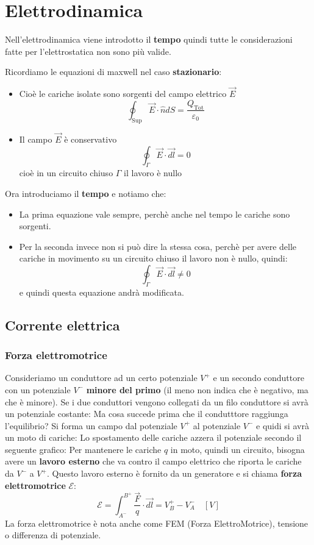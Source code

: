 \documentclass[a4paper]{article}
\begin{document}
\section{Elettrodinamica}
Nell'elettrodinamica viene introdotto il \textbf{tempo} quindi tutte le considerazioni
fatte per l'elettrostatica non sono più valide.

Ricordiamo le equazioni di maxwell nel caso \textbf{stazionario}:
\begin{itemize}
  \item 
    Cioè le cariche isolate sono sorgenti del campo elettrico \( \vec{E} \) 
    \[
      \oint_{\text{Sup}} \vec{E} \cdot \hat{n} dS = \frac{Q_{\text{Tot}}}{\varepsilon_0}
    \] 

  \item Il campo \( \vec{E} \) è conservativo
    \[
      \oint_{\Gamma} \vec{E} \cdot \vec{dl} = 0
    \] 
    cioè in un circuito chiuso \( \Gamma \) il lavoro è nullo
\end{itemize}
Ora introduciamo il \textbf{tempo} e notiamo che:
\begin{itemize}
  \item La prima equazione vale sempre, perchè anche nel tempo le cariche sono sorgenti.

  \item Per la seconda invece non si può dire la stessa cosa, perchè per avere delle 
    cariche in movimento su un circuito chiuso il lavoro non è nullo, quindi:
    \[
      \oint_{\Gamma } \vec{E} \cdot \vec{dl} \neq 0
    \] 
    e quindi questa equazione andrà modificata.
\end{itemize}

\subsection{Corrente elettrica}
\subsubsection{Forza elettromotrice}
Consideriamo un conduttore ad un certo potenziale \( V^+ \)  e un secondo conduttore con
un potenziale \( V^- \)  \textbf{minore del primo} (il meno non indica che è negativo,
ma che è minore).
\label{30-04-D1}
Se i due conduttori vengono collegati da un filo conduttore si avrà un potenziale costante:
\label{30-04-D2}
Ma cosa succede prima che il condutttore raggiunga l'equilibrio?
Si forma un campo dal potenziale \( V^+ \) al potenziale \( V^- \)  e quidi si avrà
un moto di cariche:
\label{30-04-D3}
Lo spostamento delle cariche azzera il potenziale secondo il seguente grafico:
\label{30-04-D4}
Per mantenere le cariche \( q \) in moto, quindi un circuito, bisogna avere un \textbf{lavoro
esterno} che va contro il campo elettrico che riporta le cariche da \( V^- \) a
\( V^+ \). Questo lavoro esterno è fornito da un generatore e si chiama \textbf{forza
elettromotrice} \( \mathcal{E} \):
\label{30-04-D5}
\[
  \mathcal{E} = \int_{A^-}^{B^+} \frac{\vec{F}}{q} \cdot \vec{dl}
  = V^+_B - V^-_A \quad \left[ V \right]
\] 
La forza elettromotrice è nota anche come FEM (Forza ElettroMotrice), tensione o
differenza di potenziale.
\end{document}
